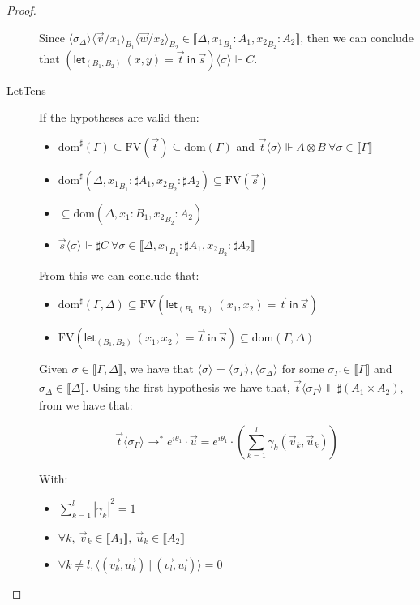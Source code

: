 \documentclass[runningheads,orivec,envcountsame,envcountsect]{llncs}
\newcommand\lra{\longrightarrow}
\newcommand\ansubst[2]{\ensuremath{\langle #1 \rangle_{#2}}}
\newcommand\dom[1]{\mathrm{dom}(#1)}
\newcommand\sdom[1]{\mathrm{dom}^{\sharp}(#1)}
\newcommand\FV[1]{\mathrm{FV}(#1)}
\def\scal#1#2{\langle{#1}~|~{#2}\rangle}
\def\Pair#1#2{(#1,#2)} %
\def\letkeyword{\mathsf{let}}
\def\inkeyword{\mathsf{in}}
\def\LetP#1#2#3#4#5#6{\letkeyword_{\Pair{#2}{#4}}~\Pair{#1}{#3}=#5~\inkeyword~#6}
\def\eval{\lra^*}
\def\sem#1{\llbracket#1\rrbracket}
\def\real{\Vdash}
\begin{document}
\begin{proof}
\begin{description}
    Since $\ansubst{\sigma_\Delta}{}\ansubst{\vec{v}/x_1}{B_1}\ansubst{\vec{w}/x_2}{B_2}\in\sem{\Delta,{x_1}_{B_1}:A_1,{x_2}_{B_2}:A_2}$, then we can conclude that $(\LetP{x}{B_1}{y}{B_2}{\vec{t}}{\vec{s}})\ansubst{\sigma}{}\real C$.

    \item[LetTens] If the hypotheses are valid then:
    \begin{itemize}
        \item $\sdom{\Gamma}\subseteq \FV{\vec t} \subseteq \dom{\Gamma}$ and $\vec t \ansubst{\sigma}{}\Vdash A\otimes B\ \forall \sigma\in\sem\Gamma$
        \item $\sdom{\Delta, {x_1}_{B_1}:\sharp A_1, {x_2}_{B_2}:\sharp A_2}\subseteq \FV{\vec s}$
        \item $\subseteq \dom{\Delta,{x_1}:{B_1}, {x_2}_{B_2}:A_2}$
        \item $\vec s \ansubst{\sigma}{}\Vdash \sharp C\ \forall \sigma\in\sem{\Delta, {x_1}_{B_1}:\sharp A_1, {x_2}_{B_2}:\sharp A_2}$
    \end{itemize}
    
    From this we can conclude that:
    \begin{itemize}
        \item $\sdom{\Gamma,\Delta}\subseteq\FV{\LetP{x_1}{B_1}{x_2}{B_2}{\vec{t}}{\vec{s}}}$
        \item $\FV{\LetP{x_1}{B_1}{x_2}{B_2}{\vec{t}}{\vec{s}}}\subseteq\dom{\Gamma,\Delta}$
    \end{itemize}
    
    Given $\sigma\in\sem{\Gamma,\Delta}$, we have that $\ansubst{\sigma}{}=\ansubst{\sigma_\Gamma}{},\ansubst{\sigma_\Delta}{}$ for some $\sigma_\Gamma\in\sem\Gamma$ and $\sigma_\Delta\in\sem\Delta$. Using the first hypothesis we have that, $\vec t\ansubst{\sigma_\Gamma}{}\real \sharp(A_1\times A_2)$, from  we have that:
    
    \[\vec t\ansubst{\sigma_\Gamma}{}\eval e^{i\theta_1}\cdot\vec{u}=e^{i\theta_1}\cdot(\sum_{k=1}^{l} \gamma_k \Pair{\vec v_k}{\vec u_k})\] 
    
    With:
    \begin{itemize}
        \item $\sum_{k=1}^{l} |\gamma_k|^2 = 1$
        \item $\forall k,\ \vec v_k\in\sem{A_1},\ \vec u_k\in\sem{A_2}$
        \item $\forall k\neq l, \scal{\Pair{\vec{v_k}}{\vec{u_k}}}{\Pair{\vec{v_l}}{\vec{u_l}}}= 0$
    \end{itemize}
    

\end{description}
\end{proof}
\end{document}
